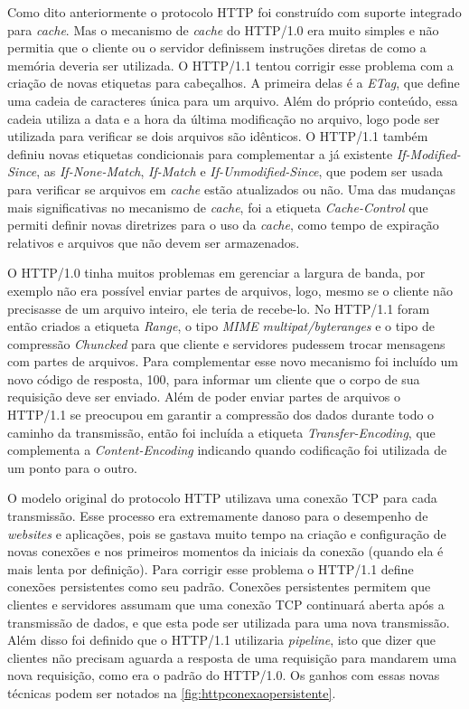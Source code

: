 Como dito anteriormente o protocolo HTTP foi construído com suporte integrado para \textit{cache}. Mas o mecanismo de \textit{cache} do HTTP/1.0 era muito simples e não permitia que o cliente ou o servidor definissem instruções diretas de como a memória deveria ser utilizada. O HTTP/1.1 tentou corrigir esse problema com a criação de novas etiquetas para cabeçalhos. A primeira delas é a \textit{ETag}, que define uma cadeia de caracteres única para um arquivo. Além do próprio conteúdo, essa cadeia utiliza a data e a hora da última modificação no arquivo, logo pode ser utilizada para verificar se dois arquivos são idênticos. O HTTP/1.1 também definiu novas etiquetas condicionais para complementar a já existente \textit{If-Modified-Since}, as \textit{If-None-Match}, \textit{If-Match} e \textit{If-Unmodified-Since}, que podem ser usada para verificar se arquivos em \textit{cache} estão atualizados ou não. Uma das mudanças mais significativas no mecanismo de \textit{cache}, foi a etiqueta \textit{Cache-Control} que permiti definir novas diretrizes para o uso da \textit{cache}, como tempo de expiração relativos e arquivos que não devem ser armazenados.

O HTTP/1.0 tinha muitos problemas em gerenciar a largura de banda, por exemplo não era possível enviar partes de arquivos, logo, mesmo se o cliente não precisasse de um arquivo inteiro, ele teria de recebe-lo. No HTTP/1.1 foram então criados a etiqueta \textit{Range}, o tipo \textit{MIME} \textit{multipat/byteranges} e o tipo de compressão \textit{Chuncked} para que cliente e servidores pudessem trocar mensagens com partes de arquivos. Para complementar esse novo mecanismo foi incluído um novo código de resposta, 100, para informar um cliente que o corpo de sua requisição deve ser enviado. Além de poder enviar partes de arquivos o HTTP/1.1 se preocupou em garantir a compressão dos dados durante todo o caminho da transmissão, então foi incluída a etiqueta \textit{Transfer-Encoding}, que complementa a \textit{Content-Encoding} indicando quando codificação foi utilizada de um ponto para o outro.

O modelo original do protocolo HTTP utilizava uma conexão TCP para cada transmissão. Esse processo era extremamente danoso para o desempenho de \textit{websites} e aplicações, pois se gastava muito tempo na criação e configuração de novas conexões e nos primeiros momentos da iniciais da conexão (quando ela é mais lenta por definição). Para corrigir esse problema o HTTP/1.1 define conexões persistentes como seu padrão. Conexões persistentes permitem que clientes e servidores assumam que uma conexão TCP continuará aberta após a transmissão de dados, e que esta pode ser utilizada para uma nova transmissão. Além disso foi definido que o HTTP/1.1 utilizaria \textit{pipeline}, isto que dizer que clientes não precisam aguarda a resposta de uma requisição para mandarem uma nova requisição, como era o padrão do HTTP/1.0. Os ganhos com essas novas técnicas podem ser notados na \autoref{fig:httpconexaopersistente}.

